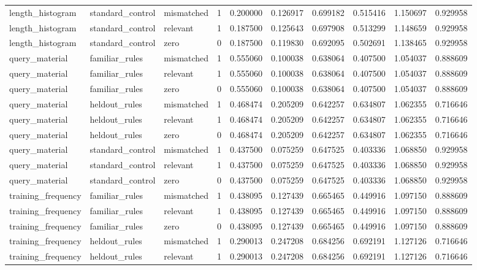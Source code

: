 \begin{tabular}{llllllllll}
length\_histogram & standard\_control & mismatched & 1 & 0.200000 & 0.126917 & 0.699182 & 0.515416 & 1.150697 & 0.929958 \\
length\_histogram & standard\_control & relevant & 1 & 0.187500 & 0.125643 & 0.697908 & 0.513299 & 1.148659 & 0.929958 \\
length\_histogram & standard\_control & zero & 0 & 0.187500 & 0.119830 & 0.692095 & 0.502691 & 1.138465 & 0.929958 \\
query\_material & familiar\_rules & mismatched & 1 & 0.555060 & 0.100038 & 0.638064 & 0.407500 & 1.054037 & 0.888609 \\
query\_material & familiar\_rules & relevant & 1 & 0.555060 & 0.100038 & 0.638064 & 0.407500 & 1.054037 & 0.888609 \\
query\_material & familiar\_rules & zero & 0 & 0.555060 & 0.100038 & 0.638064 & 0.407500 & 1.054037 & 0.888609 \\
query\_material & heldout\_rules & mismatched & 1 & 0.468474 & 0.205209 & 0.642257 & 0.634807 & 1.062355 & 0.716646 \\
query\_material & heldout\_rules & relevant & 1 & 0.468474 & 0.205209 & 0.642257 & 0.634807 & 1.062355 & 0.716646 \\
query\_material & heldout\_rules & zero & 0 & 0.468474 & 0.205209 & 0.642257 & 0.634807 & 1.062355 & 0.716646 \\
query\_material & standard\_control & mismatched & 1 & 0.437500 & 0.075259 & 0.647525 & 0.403336 & 1.068850 & 0.929958 \\
query\_material & standard\_control & relevant & 1 & 0.437500 & 0.075259 & 0.647525 & 0.403336 & 1.068850 & 0.929958 \\
query\_material & standard\_control & zero & 0 & 0.437500 & 0.075259 & 0.647525 & 0.403336 & 1.068850 & 0.929958 \\
training\_frequency & familiar\_rules & mismatched & 1 & 0.438095 & 0.127439 & 0.665465 & 0.449916 & 1.097150 & 0.888609 \\
training\_frequency & familiar\_rules & relevant & 1 & 0.438095 & 0.127439 & 0.665465 & 0.449916 & 1.097150 & 0.888609 \\
training\_frequency & familiar\_rules & zero & 0 & 0.438095 & 0.127439 & 0.665465 & 0.449916 & 1.097150 & 0.888609 \\
training\_frequency & heldout\_rules & mismatched & 1 & 0.290013 & 0.247208 & 0.684256 & 0.692191 & 1.127126 & 0.716646 \\
training\_frequency & heldout\_rules & relevant & 1 & 0.290013 & 0.247208 & 0.684256 & 0.692191 & 1.127126 & 0.716646 \\

\end{tabular}
